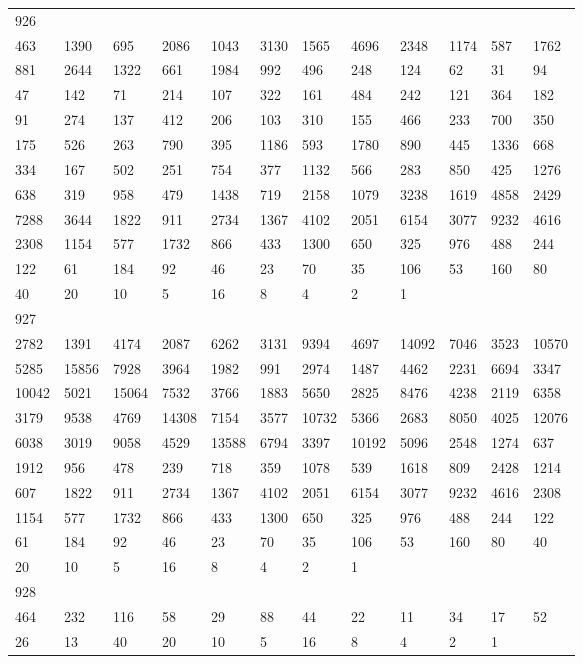 \begin{longtable}{llllllllllll}
926&&&&&&&&&&&\\
463& 1390& 695& 2086& 1043& 3130& 1565& 4696& 2348& 1174& 587& 1762\\
881& 2644& 1322& 661& 1984& 992& 496& 248& 124& 62& 31& 94\\
47& 142& 71& 214& 107& 322& 161& 484& 242& 121& 364& 182\\
91& 274& 137& 412& 206& 103& 310& 155& 466& 233& 700& 350\\
175& 526& 263& 790& 395& 1186& 593& 1780& 890& 445& 1336& 668\\
334& 167& 502& 251& 754& 377& 1132& 566& 283& 850& 425& 1276\\
638& 319& 958& 479& 1438& 719& 2158& 1079& 3238& 1619& 4858& 2429\\
7288& 3644& 1822& 911& 2734& 1367& 4102& 2051& 6154& 3077& 9232& 4616\\
2308& 1154& 577& 1732& 866& 433& 1300& 650& 325& 976& 488& 244\\
122& 61& 184& 92& 46& 23& 70& 35& 106& 53& 160& 80\\
40& 20& 10& 5& 16& 8& 4& 2& 1& \\

927&&&&&&&&&&&\\
2782& 1391& 4174& 2087& 6262& 3131& 9394& 4697& 14092& 7046& 3523& 10570\\
5285& 15856& 7928& 3964& 1982& 991& 2974& 1487& 4462& 2231& 6694& 3347\\
10042& 5021& 15064& 7532& 3766& 1883& 5650& 2825& 8476& 4238& 2119& 6358\\
3179& 9538& 4769& 14308& 7154& 3577& 10732& 5366& 2683& 8050& 4025& 12076\\
6038& 3019& 9058& 4529& 13588& 6794& 3397& 10192& 5096& 2548& 1274& 637\\
1912& 956& 478& 239& 718& 359& 1078& 539& 1618& 809& 2428& 1214\\
607& 1822& 911& 2734& 1367& 4102& 2051& 6154& 3077& 9232& 4616& 2308\\
1154& 577& 1732& 866& 433& 1300& 650& 325& 976& 488& 244& 122\\
61& 184& 92& 46& 23& 70& 35& 106& 53& 160& 80& 40\\
20& 10& 5& 16& 8& 4& 2& 1& \\

928&&&&&&&&&&&\\
464& 232& 116& 58& 29& 88& 44& 22& 11& 34& 17& 52\\
26& 13& 40& 20& 10& 5& 16& 8& 4& 2& 1& \\


\end{longtable}
